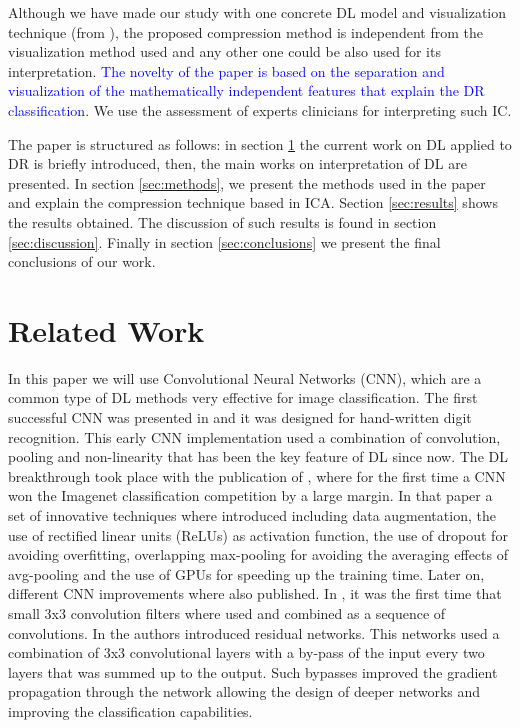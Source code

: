 \documentclass[review]{elsarticle}
\theoremstyle{definition} %
\theoremstyle{remark}
\begin{document}
Although we have made our study with one concrete DL model and visualization technique (from \cite{de2017deep}), the proposed compression method is independent from the visualization method used and any other one could be also used for its interpretation. \textcolor{blue}{The novelty of the paper is based on the separation and visualization of the mathematically independent features that explain the DR classification}. We use the assessment of experts clinicians for interpreting such IC.

The paper is structured as follows: in section \ref{sec:related} the current work on DL applied to DR is briefly introduced, then, the main works on interpretation of DL are presented. In section \ref{sec:methods}, we present the methods used in the paper and explain the compression technique based in ICA. Section \ref{sec:results} shows the results obtained. The discussion of such results is found in section \ref{sec:discussion}. Finally in section \ref{sec:conclusions} we present the final conclusions of our work.

\section{Related Work}\label{sec:related}

In this paper we will use Convolutional Neural Networks (CNN), which are a common type of DL methods very effective for image classification. The first successful CNN was presented in \cite{LeCun:98} and it was designed for hand-written digit recognition. This early CNN implementation used a combination of convolution, pooling and non-linearity that has been the key feature of DL since now. The DL breakthrough took place with the publication of \cite{NIPS2012_4824}, where for the first time a CNN won the Imagenet\cite{imagenet_cvpr09} classification competition by a large margin. In that paper a set of innovative techniques where introduced including data augmentation, the use of rectified linear units (ReLUs) as activation function, the use of dropout for avoiding overfitting, overlapping max-pooling for avoiding the averaging effects of avg-pooling and the use of GPUs for speeding up the training time. Later on, different CNN improvements where also published. In \cite{vggnet}, it was the first time that small 3x3 convolution filters where used and combined as a sequence of convolutions. In \cite{he2016deep} the authors introduced residual networks. This networks used a combination of 3x3 convolutional layers with a by-pass of the input every two layers that was summed up to the output. Such bypasses improved the gradient propagation through the network allowing the design of deeper networks and improving the classification capabilities. 
\end{document}
